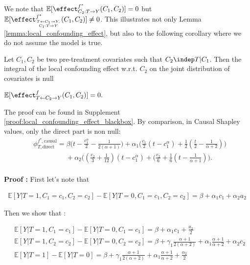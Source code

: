 We note that $\mathbb{E}[\effect^{f^*}_{C_2: T \rightarrow Y}(C_1,C_2)] = 0$ but $\mathbb{E}[\effect^{f^*}_{T \leftarrow C_1 \rightarrow Y, \atop C_1: T \rightarrow Y}(C_1,C_2)] \neq 0$. This illustrates not only Lemma \ref{lemma:local_confounding_effect}, but also to the following corollary where we do not assume the model is true.

\begin{corollary} \label{cor:local_confounding_effect_blackbox}
 Let $C_1, C_2$ be two pre-treatment covariates such that $C_2 \indep T | C_1$. Then the integral of the local confounding effect w.r.t. $C_2$ on the joint distribution of covariates is null \\
\centerline{ $ \mathbb{E}[\effect^f_{T \leftarrow C_2 \rightarrow Y}(C_1,C_2)] = 0.$ }
\end{corollary}
The proof can be found in Supplement \ref{proof:local_confounding_effect_blackbox}.
By comparison, in Causal Shapley values, only the direct part is non null: 
\begin{align*}
    &\phi^{f^*,\text{causal}}_{T,\text{direct}} = \beta \big(t - \frac{c_1^\alpha}{2} - \frac{1}{2(\alpha+1)} \big)
     + \alpha_1 \big(\frac{c_1}{2}(t - c_1^\alpha) +\frac{1}{2}( \frac{t}{2} - \frac{1}{\alpha+2}) \big) \\
     & \hspace{2cm} + \alpha_2 \big((\frac{c_2}{3} + \frac{1}{12})(t - c_1^\alpha) + (\frac{c_2}{6} + \frac{1}{6}(t - \frac{1}{\alpha+1}) \big). \\
\end{align*}

\textbf{Proof :} First let's note that

\begin{align*}
    \mathbb{E}[Y|T=1,C_1=c_1,C_2=c_2] - \mathbb{E}[Y|T=0,C_1=c_1,C_2=c_2] = \beta + \alpha_1c_1 + \alpha_2a_2
\end{align*}


Then we show that :

\begin{align*}
    &\mathbb{E}[Y|T=1,C_1=c_1] - \mathbb{E}[Y|T=0,C_1=c_1] = \beta + \alpha_1c_1 + \frac{a_2}{2} \\
    &\mathbb{E}[Y|T=1,C_2=c_2] - \mathbb{E}[Y|T=0,C_2=c_2] = \beta + \gamma_1\frac{\alpha+1}{2(\alpha+2)} + \alpha_1\frac{\alpha+1}{\alpha+2} + \alpha_2c_2 \\
    &\mathbb{E}[Y|T=1] - \mathbb{E}[Y|T=0] = \beta + \gamma_1\frac{\alpha + 1}{2(\alpha + 2)} + \alpha_1\frac{\alpha+1}{\alpha+2} + \frac{\alpha_2}{2}   \\
\end{align*}



